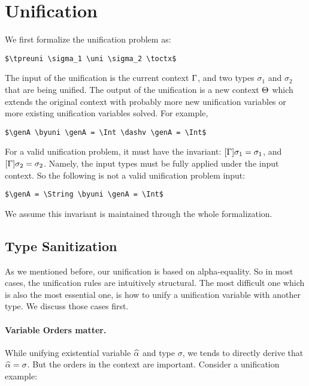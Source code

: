 \section{Unification}

We first formalize the unification problem as:

\begin{lstlisting}
$\tpreuni \sigma_1 \uni \sigma_2 \toctx$
\end{lstlisting}

The input of the unification is the current context $\Gamma$, and two types
$\sigma_1$ and $\sigma_2$ that are being unified. The output of the unification
is a new context $\Theta$ which extends the original context with probably more
new unification variables or more existing
unification variables solved. For example,

\begin{lstlisting}
$\genA \byuni \genA = \Int \dashv \genA = \Int$
\end{lstlisting}

For a valid unification problem, it must have the invariant: $[\Gamma] \sigma_1 =
\sigma_1$, and $[\Gamma] \sigma_2 = \sigma_2$. Namely, the input types must be
fully applied under the input context. So the following is not a valid
unification problem input:

\begin{lstlisting}
$\genA = \String \byuni \genA = \Int$
\end{lstlisting}

We assume this invariant is maintained through the whole
formalization.

\subsection{Type Sanitization}

As we mentioned before, our unification is based on alpha-equality. So in most
cases, the unification rules are intuitively structural. The most difficult
one which is also the most essential one, is how to unify a unification variable
with another type. We discuss those cases first.

\paragraph{Variable Orders matter.}

While unifying existential variable $\widehat{\alpha}$ and type $\sigma$, we tends to
directly derive that $\widehat{\alpha} = \sigma$. But the orders in the context are
important. Consider a unification example:

